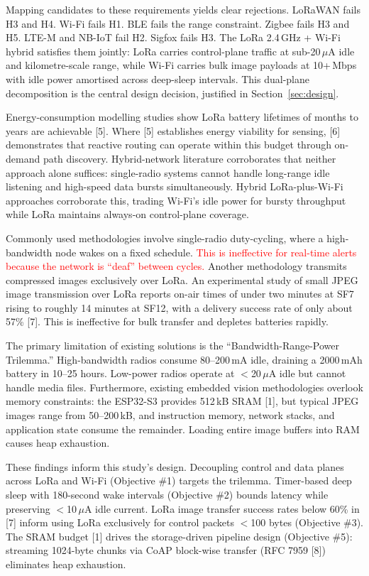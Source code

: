 \documentclass[12pt,a4paper]{article}
\DeclareRobustCommand{\changed}[1]{\textcolor{red}{#1}}
\begin{document}
Mapping candidates to these requirements yields clear rejections. LoRaWAN fails H3 and H4. Wi-Fi fails H1. BLE fails the range constraint. Zigbee fails H3 and H5. LTE-M and NB-IoT fail H2. Sigfox fails H3. The LoRa 2.4\,GHz + Wi-Fi hybrid satisfies them jointly: LoRa carries control-plane traffic at sub-20\,$\mu$A idle and kilometre-scale range, while Wi-Fi carries bulk image payloads at 10+\,Mbps with idle power amortised across deep-sleep intervals. This dual-plane decomposition is the central design decision, justified in Section~\ref{sec:design}.

Energy-consumption modelling studies show LoRa battery lifetimes of months to years are achievable [5]. Where [5] establishes energy viability for sensing, [6] demonstrates that reactive routing can operate within this budget through on-demand path discovery. Hybrid-network literature corroborates that neither approach alone suffices: single-radio systems cannot handle long-range idle listening and high-speed data bursts simultaneously. Hybrid LoRa-plus-Wi-Fi approaches corroborate this, trading Wi-Fi's idle power for bursty throughput while LoRa maintains always-on control-plane coverage.

Commonly used methodologies involve single-radio duty-cycling, where a high-bandwidth node wakes on a fixed schedule. \changed{This is ineffective for real-time alerts because the network is ``deaf'' between cycles.} Another methodology transmits compressed images exclusively over LoRa. An experimental study of small JPEG image transmission over LoRa reports on-air times of under two minutes at SF7 rising to roughly 14 minutes at SF12, with a delivery success rate of only about 57\% [7]. This is ineffective for bulk transfer and depletes batteries rapidly.

The primary limitation of existing solutions is the ``Bandwidth-Range-Power Trilemma.'' High-bandwidth radios consume 80--200\,mA idle, draining a 2000\,mAh battery in 10--25 hours. Low-power radios operate at $<$20\,$\mu$A idle but cannot handle media files. Furthermore, existing embedded vision methodologies overlook memory constraints: the ESP32-S3 provides 512\,kB SRAM [1], but typical JPEG images range from 50--200\,kB, and instruction memory, network stacks, and application state consume the remainder. Loading entire image buffers into RAM causes heap exhaustion.

These findings inform this study's design. Decoupling control and data planes across LoRa and Wi-Fi (Objective \#1) targets the trilemma. Timer-based deep sleep with 180-second wake intervals (Objective \#2) bounds latency while preserving $<$10\,$\mu$A idle current. LoRa image transfer success rates below 60\% in [7] inform using LoRa exclusively for control packets $<$100 bytes (Objective \#3). The SRAM budget [1] drives the storage-driven pipeline design (Objective \#5): streaming 1024-byte chunks via CoAP block-wise transfer (RFC 7959 [8]) eliminates heap exhaustion.
\end{document}
